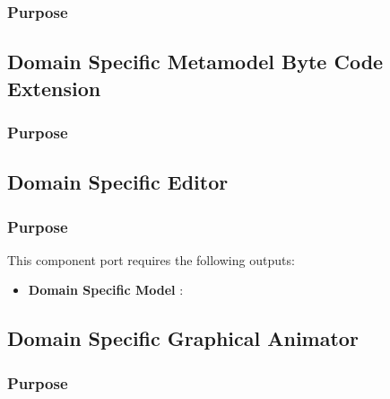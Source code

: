 \documentclass{gemoc} %
\begin{document}
\subsubsection{Purpose}



\subsection{Domain Specific Metamodel Byte Code Extension}


\subsubsection{Purpose}



\subsection{Domain Specific Editor}


\subsubsection{Purpose}


This component port requires the following outputs:
\begin{itemize}
  \item \textbf{Domain Specific Model} :
\end{itemize}

\subsection{Domain Specific Graphical Animator}


\subsubsection{Purpose}
\end{document}
